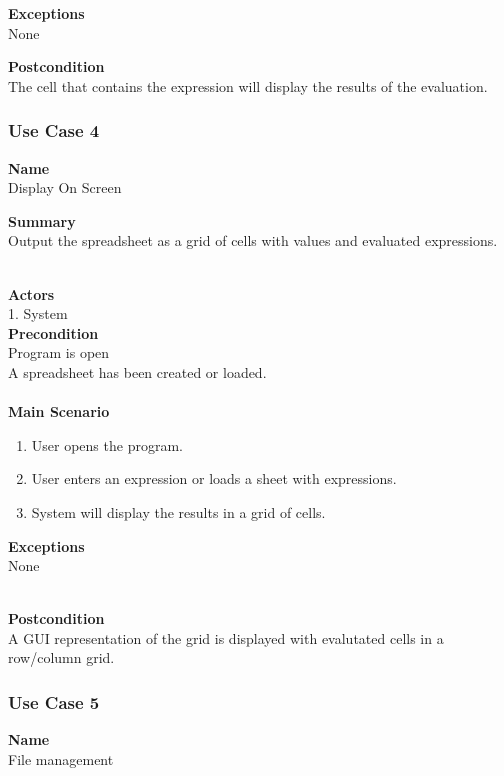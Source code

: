 \documentclass[12pt]{article}
\begin{document}
\noindent
{\bf Exceptions}\\
None

\noindent
{\bf Postcondition}\\
The cell that contains the expression will display the results of the evaluation.

\clearpage

\subsubsection{Use Case 4} \label{uc:4}

\noindent
{\bf Name}\\
Display On Screen

\noindent
{\bf Summary}\\
Output the spreadsheet as a grid of cells with values and evaluated expressions.

\noindent\\
{\bf Actors}\\
1. System\\

\noindent
{\bf Precondition}\\
Program is open\\
A spreadsheet has been created or loaded.\\
\noindent\\
{\bf Main Scenario}\\
\vspace*{-0.2in}
\begin{enumerate}
\item User opens the program.
\item User enters an expression or loads a sheet with expressions.
\item System will display the results in a grid of cells.
\end{enumerate}

\noindent
{\bf Exceptions}\\
None

\noindent\\
{\bf Postcondition}\\
A GUI representation of the grid is displayed with evalutated cells in a row/column grid.

\clearpage


\subsubsection{Use Case 5} \label{uc:5}

\noindent
{\bf Name}\\
File management
\end{document}
